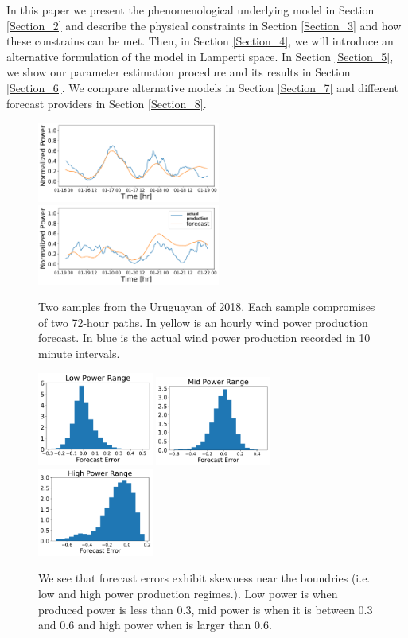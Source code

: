 \documentclass[11pt,english]{article}
\begin{document}
In this paper we present the phenomenological underlying model in Section \ref{Section_2} and describe the physical constraints in Section \ref{Section_3} and how these constrains can be met. Then, in Section \ref{Section_4}, we will introduce an alternative formulation of the model in Lamperti space. In Section \ref{Section_5}, we show our parameter estimation procedure and its results in Section \ref{Section_6}. We compare alternative models in Section \ref{Section_7} and different forecast providers in Section \ref{Section_8}.

\begin{figure}
  \includegraphics[width=60mm,scale=1]{plots/data_1516064400.pdf}
  \includegraphics[width=60mm,scale=1]{plots/data_1516323600.pdf}\\
  \caption{Two samples from the Uruguayan of 2018. Each sample compromises of two 72-hour paths. In yellow is an hourly wind power production forecast. In blue is the actual wind power production recorded in 10 minute intervals.}
  \label{fig:sample_data}
\end{figure}

\begin{figure}
  \includegraphics[width=38mm,scale=1]{plots/hist_low.pdf}
  \includegraphics[width=38mm,scale=1]{plots/hist_mid.pdf}
  \includegraphics[width=38mm,scale=1]{plots/hist_high.pdf}
  \caption{We see that forecast errors exhibit skewness near the boundries (i.e. low and high power production regimes.). Low power is when produced power is less than $0.3$, mid power is when it is between $0.3$ and $0.6$ and high power when is larger than $0.6$. }
  \label{fig:skew_data}
\end{figure}
\end{document}
